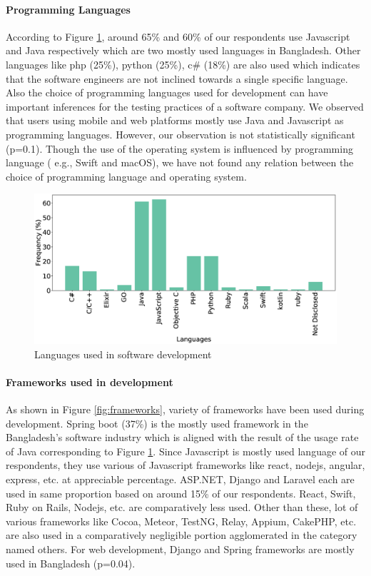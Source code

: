 \paragraph{Programming Languages}
According to Figure \ref{fig:languages}, around 65\% and 60\% of our respondents use Javascript and Java respectively which are two mostly used languages in Bangladesh. Other languages like php (25\%), python (25\%), c\# (18\%) are also used which indicates that the software engineers are not inclined towards a single specific language. Also the choice of programming languages used for development can have important inferences for the testing practices of a software company. We observed that users using mobile and web platforms mostly use Java and Javascript as programming languages. However, our observation is not statistically significant (p=0.1). Though the use of the operating system is influenced by programming language ( e.g., Swift and macOS), we have not found any relation between the choice of programming language and operating system.

\begin{figure}[h]
\centering
  \includegraphics[scale=0.18]{Figures/Respondents_languages}
  \caption{Languages used in software development}
  \label{fig:languages}
\end{figure}

\paragraph{Frameworks used in development}
As shown in Figure \ref{fig:frameworks}, variety of frameworks have been used during development. Spring boot (37\%) is the mostly used framework in the Bangladesh's software industry which is aligned with the result of the usage rate of Java corresponding to Figure \ref{fig:languages}. Since Javascript is mostly used language of our respondents, they use various of Javascript frameworks like react, nodejs, angular, express, etc. at appreciable percentage. ASP.NET, Django and Laravel each are used in same proportion based on around 15\% of our respondents. React, Swift, Ruby on Rails, Nodejs, etc. are comparatively less used. Other than these, lot of various frameworks like Cocoa, Meteor, TestNG, Relay, Appium, CakePHP, etc. are also used in a comparatively negligible portion agglomerated in the category named others. For web development, Django and Spring frameworks are mostly used in Bangladesh (p=0.04).

